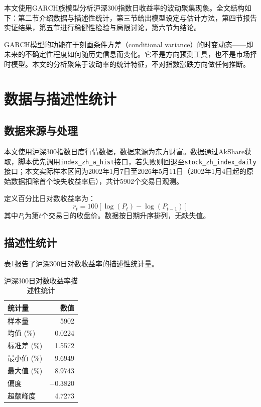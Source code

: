 \documentclass[11pt,a4paper]{article}
\begin{document}
本文使用GARCH族模型分析沪深300指数日收益率的波动聚集现象。全文结构如下：第二节介绍数据与描述性统计，第三节给出模型设定与估计方法，第四节报告实证结果，第五节进行稳健性检验与局限讨论，第六节为结论。

GARCH模型的功能在于刻画条件方差（conditional variance）的时变动态——即未来的不确定性程度如何随历史信息而变化。它不是方向预测工具，也不是市场择时模型。本文的分析聚焦于波动率的统计特征，不对指数涨跌方向做任何推断。

\section{数据与描述性统计}

\subsection{数据来源与处理}

本文使用沪深300指数日度行情数据，数据来源为东方财富。数据通过AkShare获取，脚本优先调用\texttt{index\_zh\_a\_hist}接口，若失败则回退至\texttt{stock\_zh\_index\_daily}接口；本文实际样本区间为2002年1月7日至2026年5月11日（2002年1月4日起的原始数据扣除首个缺失收益率后），共计5902个交易日观测。

定义百分比日对数收益率为：
\[
r_t = 100[\log(P_t)-\log(P_{t-1})]
\]
其中\(P_t\)为第\(t\)个交易日的收盘价。数据按日期升序排列，无缺失值。

\subsection{描述性统计}

表1报告了沪深300日对数收益率的描述性统计量。

\begin{table}[ht]
\centering
\caption{沪深300日对数收益率描述性统计}
\begin{tabular}{lr}
\toprule
统计量 & 数值 \\
\midrule
样本量 & 5902 \\
均值 (\%) & 0.0224 \\
标准差 (\%) & 1.5572 \\
最小值 (\%) & $-9.6949$ \\
最大值 (\%) & 8.9743 \\
偏度 & $-0.3820$ \\
超额峰度 & 4.7273 \\
\bottomrule
\end{tabular}
\end{table}
\end{document}
